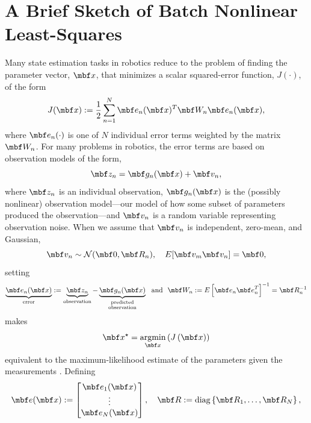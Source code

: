 \documentclass[11pt,a4,oneside]{article}
\begin{document}
\section{A Brief Sketch of Batch Nonlinear Least-Squares \label{s:nllsq}}%
Many state estimation tasks in robotics reduce to the problem of finding the parameter vector, $\mbf x$, that minimizes a scalar squared-error function, $J(\cdot)$, of the form
\begin{equation}
  \label{eq:errorFunction}
  J(\mbf x) := \frac{1}{2}\sum_{n=1}^N \mbf e_n(\mbf x)^T \mbf W_{n} \mbf e_n(\mbf x),
\end{equation}
where $\mbf e_n(\cdot)$ is one of $N$ individual error terms weighted by the matrix $\mbf W_n$. 
For many problems in robotics, the error terms are based on observation models of the form,
\begin{equation}
  \label{eq:generic-observation}
  \mbf z_n = \mbf g_n( \mbf x ) + \mbf v_n  ,
\end{equation}
where $\mbf z_n$ is an individual observation, $\mbf g_n( \mbf x )$ is the (possibly nonlinear) observation model---our model of how some subset of parameters produced the observation---and $\mbf v_n$ is a random variable representing observation noise.
When we assume that $\mbf v_n$ is independent, zero-mean, and  Gaussian,
\begin{equation}
  \label{eq:zm-gn}
  \mbf v_n \sim \mathcal{N}(\mbf 0, \mbf R_n), \quad E[\mbf v_m \mbf v_n] = \mbf 0,
\end{equation}
setting 
\begin{equation}
  \label{eq:generic-errorTerm}
  \underbrace{\mbf e_n(\mbf x)}_{\text{error}} := \underbrace{\mbf z_n}_{\text{observation}} - \underbrace{\mbf g_n( \mbf x )}_{\substack{\text{predicted}\\\text{observation}}} ~~\text{and}~~ \mbf W_n := E\left[ \mbf e_n {\mbf e}_n^T \right]^{-1} = \mbf R^{-1}_n
\end{equation}
makes
\begin{equation}
  \label{eq:minError}
  \mbf x^\star = \underset{\mbf x}{\operatorname{argmin}}\left(J\left(\mbf x \right)\right)
\end{equation}
equivalent to the maximum-likelihood estimate of the parameters given the measurements \citep[p.~156]{Jazwinski7000}. Defining
\begin{equation}
  \label{eq:stack-intermediates}
  \mbf e(\mbf x) := 
    \bbm
      \mbf e_1(\mbf x)\\
      \vdots\\
      \mbf e_N(\mbf x)
    \ebm,
    \quad
    \mbf R := \textup{diag}\left\{\mbf R_1, \dots, \mbf R_N \right\},
\end{equation}
\end{document}
